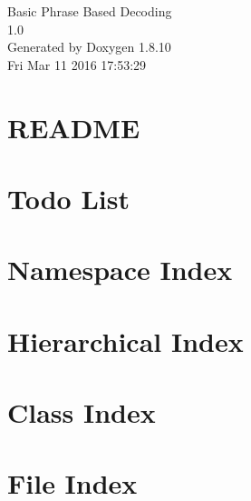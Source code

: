 \documentclass[twoside]{book}
\newcommand{\+}{\discretionary{\mbox{\scriptsize$\hookleftarrow$}}{}{}}
\newcommand{\clearemptydoublepage}{%
  \newpage{\pagestyle{empty}\cleardoublepage}%
}
\begin{document}
\hypersetup{pageanchor=false,
             bookmarks=true,
             bookmarksnumbered=true,
             pdfencoding=unicode
            }
\begin{titlepage}
\vspace*{7cm}
\begin{center}%
{\Large Basic Phrase Based Decoding \\[1ex]\large 1.\+0 }\\
\vspace*{1cm}
{\large Generated by Doxygen 1.8.10}\\
\vspace*{0.5cm}
{\small Fri Mar 11 2016 17:53:29}\\
\end{center}
\end{titlepage}
\clearemptydoublepage
\tableofcontents
\clearemptydoublepage
{}
\hypersetup{pageanchor=true}

\chapter{R\+E\+A\+D\+M\+E}
\label{md__r_e_a_d_m_e}
\hypertarget{md__r_e_a_d_m_e}{}

\chapter{Todo List}
\label{todo}
\hypertarget{todo}{}

\chapter{Namespace Index}

\chapter{Hierarchical Index}

\chapter{Class Index}

\chapter{File Index}

\end{document}
